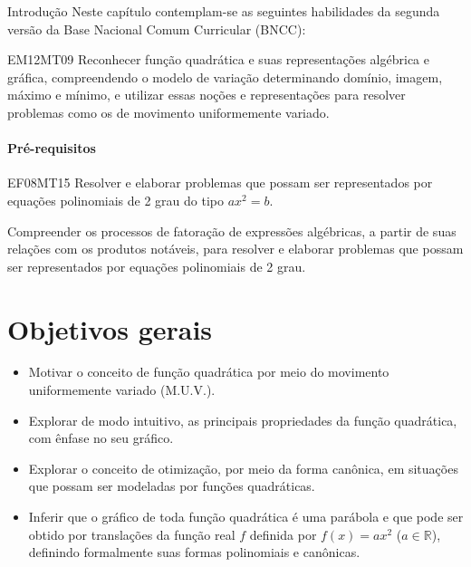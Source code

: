 \begin{apresentacao}{Introdução}
Neste capítulo contemplam-se as seguintes habilidades da segunda versão da Base Nacional Comum Curricular (BNCC):

\begin{habilities}{EM12MT09}
Reconhecer função quadrática e suas representações algébrica e gráfica, compreendendo o modelo de variação determinando domínio, imagem, máximo e mínimo, e utilizar essas noções e representações para resolver problemas como os de movimento uniformemente variado.
\end{habilities}

\paragraph{Pré-requisitos}
\begin{habilities}{EF08MT15}
Resolver e elaborar problemas que possam ser representados por equações polinomiais de 2 grau do tipo $ax^2=b$.

Compreender os processos de fatoração de expressões algébricas, a partir de suas relações com os produtos notáveis, para resolver e elaborar problemas que possam ser representados por equações polinomiais de 2 grau.
\end{habilities}

\section{Objetivos gerais}

\begin{itemize}
\item {} 
Motivar o conceito de função quadrática por meio do movimento uniformemente variado (M.U.V.).

\item {} 
Explorar de modo intuitivo, as principais propriedades da função quadrática, com ênfase no seu gráfico.

\item {} 
Explorar o conceito de otimização, por meio da forma canônica, em situações que possam ser modeladas por funções quadráticas.

\item {} 
Inferir que o gráfico de toda função quadrática é uma parábola e que pode ser obtido por translações da função real \(f\) definida por \(f(x)=ax^2\) (\(a \in \mathbb{R}\)), definindo formalmente suas formas polinomiais e canônicas.


\end{itemize}
\end{apresentacao}
